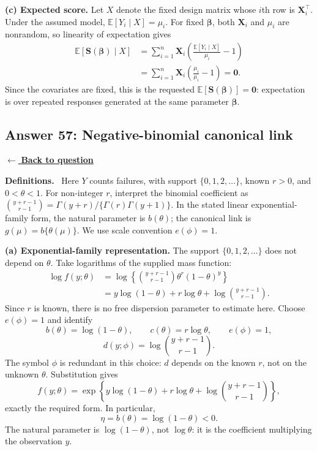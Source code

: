 \documentclass[11pt,a4paper]{article}
\newcommand{\given}{\mathrel{|}}
\newcommand{\E}{\mathbb{E}}
\newcommand{\answernav}[1]{%
  \label{answer:#1}%
  \noindent\hyperref[question:#1]{$\leftarrow$ \textbf{Back to question}}%
  \par\smallskip}
\newcommand{\studyheading}[1]{%
  \par\medskip\noindent\textcolor{statblue}{\textbf{#1.}}\ }
\begin{document}
\textbf{(c) Expected score.}
Let $X$ denote the fixed design matrix whose $i$th row is
$\mathbf X_i^\top$. Under the assumed model,
$\E[Y_i\given X]=\mu_i$. For fixed $\boldsymbol\beta$, both
$\mathbf X_i$ and $\mu_i$ are nonrandom, so linearity of expectation gives
\[
\begin{aligned}
\E[\mathbf S(\boldsymbol\beta)\given X]
&=\sum_{i=1}^n\mathbf X_i
  \left(\frac{\E[Y_i\given X]}{\mu_i}-1\right)\\
&=\sum_{i=1}^n\mathbf X_i
  \left(\frac{\mu_i}{\mu_i}-1\right)
=\boxed{\mathbf0}.
\end{aligned}
\]
Since the covariates are fixed, this is the requested
$\E[\mathbf S(\boldsymbol\beta)]=\mathbf0$: expectation is over repeated
responses generated at the same parameter $\boldsymbol\beta$.

\clearpage

\subsection{Answer 57: Negative-binomial canonical link}
\answernav{57}

\studyheading{Definitions}
Here $Y$ counts failures, with support $\{0,1,2,\ldots\}$, known $r>0$, and $0<\theta<1$.
For non-integer $r$, interpret the binomial coefficient as
$\binom{y+r-1}{r-1}=\Gamma(y+r)/\{\Gamma(r)\Gamma(y+1)\}$.
In the stated linear exponential-family form, the natural parameter is $b(\theta)$; the canonical link is $g(\mu)=b\{\theta(\mu)\}$.
We use scale convention $e(\phi)=1$.

\textbf{(a) Exponential-family representation.}
The support $\{0,1,2,\ldots\}$ does not depend on $\theta$.
Take logarithms of the supplied mass function:
\[
\begin{aligned}
\log f(y;\theta)
&=\log\left\{\binom{y+r-1}{r-1}\theta^r(1-\theta)^y\right\}\\
&=y\log(1-\theta)+r\log\theta
  +\log\binom{y+r-1}{r-1}.
\end{aligned}
\]
Since $r$ is known, there is no free dispersion parameter to estimate here.
Choose $e(\phi)=1$ and identify
\[
\boxed{
b(\theta)=\log(1-\theta),\qquad
c(\theta)=r\log\theta,\qquad e(\phi)=1,
}
\]
\[
\boxed{d(y;\phi)=\log\binom{y+r-1}{r-1}.}
\]
The symbol $\phi$ is redundant in this choice: $d$ depends on the known
$r$, not on the unknown $\theta$. Substitution gives
\[
f(y;\theta)
=\exp\left\{y\log(1-\theta)+r\log\theta+
\log\binom{y+r-1}{r-1}\right\},
\]
exactly the required form. In particular,
\[
\boxed{\eta=b(\theta)=\log(1-\theta)<0.}
\]
The natural parameter is $\log(1-\theta)$, not $\log\theta$:
it is the coefficient multiplying the observation $y$.
\end{document}

